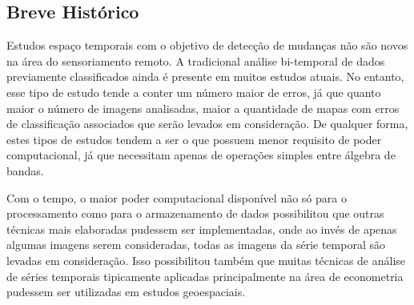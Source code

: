 \documentclass[12pt,a4paper]{article}
\begin{document}
\subsection{Breve Histórico}

Estudos espaço temporais com o objetivo de detecção de mudanças não são novos na área do sensoriamento remoto. A tradicional análise bi-temporal de dados previamente classificados ainda é presente em muitos estudos atuais. No entanto, esse tipo de estudo tende a conter um número maior de erros, já que quanto maior o número de imagens analisadas, maior a quantidade de mapas com erros de classificação associados que serão levados em consideração. De qualquer forma, estes tipos de estudos tendem a ser o que possuem menor requisito de poder computacional, já que necessitam apenas de operações simples entre álgebra de bandas.

Com o tempo, o maior poder computacional disponível não só para o processamento como para o armazenamento de dados possibilitou que outras técnicas mais elaboradas pudessem ser implementadas, onde ao invés de apenas algumas imagens serem consideradas, todas as imagens da série temporal são levadas em consideração. Isso possibilitou também que muitas técnicas de análise de séries temporais tipicamente aplicadas principalmente na área de econometria pudessem ser utilizadas em estudos geoespaciais.
\end{document}
